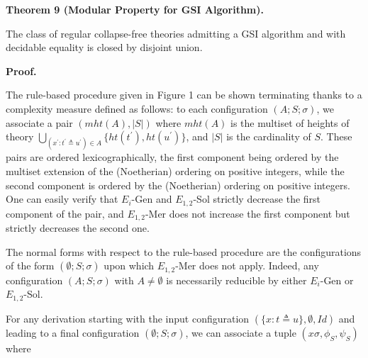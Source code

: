  
 
\par\medskip\noindent\textbf{Theorem 9 (Modular Property for GSI Algorithm).}\par
 
 
The class of regular collapse-free theories admitting a GSI algorithm and with decidable equality is closed by disjoint union.\par
 
 
 
 
\par\medskip\noindent\textbf{Proof.}\par
 
 
The rule-based procedure given in Figure 1 can be shown terminating thanks to a complexity measure defined as follows: to each configuration $(A;S;\sigma)$, we associate a pair $(mht(A),|S|)$ where $mht(A)$ is the multiset of heights of theory $\bigcup_{(x^{\prime}:t^{\prime}\triangleq u^{\prime})\in A}\{ht(t^{\prime}),ht(u^{\prime})\}$, and $|S|$ is the cardinality of $S$. These pairs are ordered lexicographically, the first component being ordered by the multiset extension of the (Noetherian) ordering on positive integers, while the second component is ordered by the (Noetherian) ordering on positive integers. One can easily verify that $E_{i}$-Gen and $E_{1,2}$-Sol strictly decrease the first component of the pair, and $E_{1,2}$-Mer does not increase the first component but strictly decreases the second one.\par
 
 
 
The normal forms with respect to the rule-based procedure are the configurations of the form $(\emptyset;S;\sigma)$ upon which $E_{1,2}$-Mer does not apply. Indeed, any configuration $(A;S;\sigma)$ with $A\neq\emptyset$ is necessarily reducible by either $E_{i}$-Gen or $E_{1,2}$-Sol.\par
 
 
 
For any derivation starting with the input configuration $(\{x:t\triangleq u\},\emptyset,\mathit{Id})$ and leading to a final configuration $(\emptyset;S;\sigma)$, we can associate a tuple $(x\sigma,\phi_{S},\psi_{S})$ where\par
  
